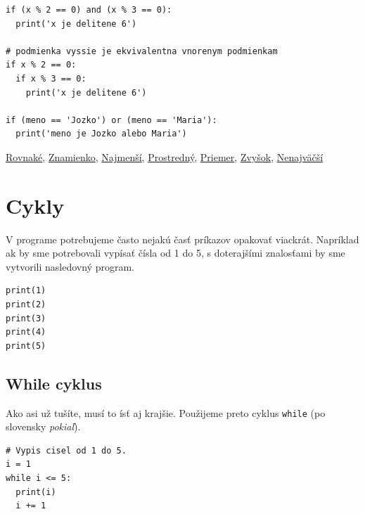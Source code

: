\documentclass{article}
\begin{document}
\begin{lstlisting}
if (x % 2 == 0) and (x % 3 == 0):
  print('x je delitene 6')

# podmienka vyssie je ekvivalentna vnorenym podmienkam
if x % 2 == 0:
  if x % 3 == 0:
    print('x je delitene 6')

if (meno == 'Jozko') or (meno == 'Maria'):
  print('meno je Jozko alebo Maria')
\end{lstlisting}

\href{https://testovac.ksp.sk/tasks/ls-uvod-rovnake/}{Rovnaké},
\href{https://testovac.ksp.sk/tasks/ls-uvod-znamienko/}{Znamienko},
\href{https://testovac.ksp.sk/tasks/ls-uvod-najmensi/}{Najmenší},
\href{https://testovac.ksp.sk/tasks/ls-uvod-prostredny/}{Prostredný},
\href{https://testovac.ksp.sk/tasks/ls-uvod-priemer/}{Priemer},
\href{https://testovac.ksp.sk/tasks/ls-uvod-zvysok/}{Zvyšok},
\href{https://testovac.ksp.sk/tasks/ls-uvod-nenajvacsi/}{Nenajväčší}

\section{Cykly}
V programe potrebujeme často nejakú časť príkazov opakovať viackrát. Napríklad ak by sme potrebovali vypísať čísla od 1 do 5, s doterajšími znalosťami by sme vytvorili nasledovný program.
\begin{lstlisting}
print(1)
print(2)
print(3)
print(4)
print(5)
\end{lstlisting}

\subsection{While cyklus}
Ako asi už tušíte, musí to ísť aj krajšie. Použijeme preto cyklus \texttt{while} (po slovensky \textit{pokiaľ}).
\begin{lstlisting}
# Vypis cisel od 1 do 5.
i = 1
while i <= 5:
  print(i)
  i += 1
\end{lstlisting}

\end{document}
